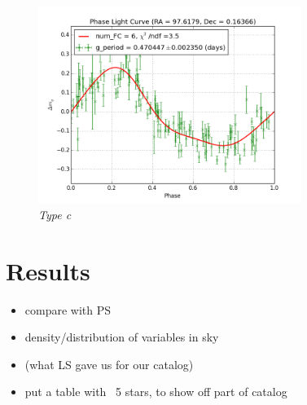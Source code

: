 \documentclass[aps,prl,twocolumn,superscriptaddress]{revtex4-1}
\begin{document}
\begin{figure}[H]
 \centering
 	\includegraphics[width=3.35in]{figures/FSP1_g_LC_rrrtest_p5_grp7.png}
 \caption{\it \small{Type c}}
 \label{fig:quartiles}
\end{figure}


\section{Results}
\begin{itemize}
	\item{} compare with PS
	\item{} density/distribution of variables in sky
	\item{} (what LS gave us for our catalog)
	\item{} put a table with ~5 stars, to show off part of catalog
\end{itemize}

\end{document}
